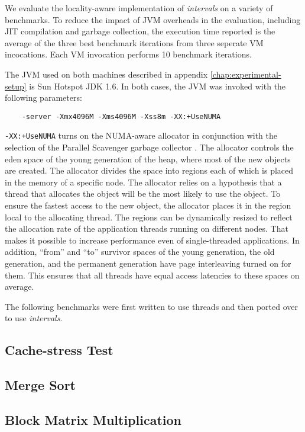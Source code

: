 We evaluate the locality-aware implementation of \emph{intervals} on a
variety of benchmarks. To reduce the impact of JVM overheads in the
evaluation, including JIT compilation and garbage collection, the
execution time reported is the average of the three best benchmark
iterations from three seperate VM incocations. Each VM invocation
performs 10 benchmark iterations.

The JVM used on both machines described in appendix
\ref{chap:experimental-setup} is Sun Hotspot JDK 1.6. In both cases,
the JVM was invoked with the following parameters:

\begin{verbatim}
    -server -Xmx4096M -Xms4096M -Xss8m -XX:+UseNUMA
\end{verbatim}

\verb!-XX:+UseNUMA! turns on the NUMA-aware allocator in conjunction
with the selection of the Parallel Scavenger garbage collector
\cite{Oracle2010} \cite{Humble2010}. The allocator controls the eden
space of the young generation of the heap, where most of the new
objects are created. The allocator divides the space into regions each
of which is placed in the memory of a specific node. The allocator
relies on a hypothesis that a thread that allocates the object will be
the most likely to use the object. To ensure the fastest access to the
new object, the allocator places it in the region local to the
allocating thread. The regions can be dynamically resized to reflect
the allocation rate of the application threads running on different
nodes. That makes it possible to increase performance even of
single-threaded applications. In addition, ``from'' and ``to''
survivor spaces of the young generation, the old generation, and the
permanent generation have page interleaving turned on for them. This
ensures that all threads have equal access latencies to these spaces
on average.

The following benchmarks were first written to use threads and then
ported over to use \emph{intervals}.

\subsection*{Cache-stress Test}


\subsection*{Merge Sort}


\subsection*{Block Matrix Multiplication}



